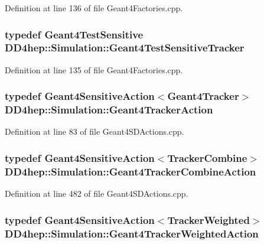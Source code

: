 Definition at line 136 of file Geant4Factories.cpp.\hypertarget{namespace_d_d4hep_1_1_simulation_a6a20cbc2140f1f0da9332fe90fb80600}{
\subsubsection[{Geant4TestSensitiveTracker}]{\setlength{\rightskip}{0pt plus 5cm}typedef {\bf Geant4TestSensitive} {\bf DD4hep::Simulation::Geant4TestSensitiveTracker}}}
\label{namespace_d_d4hep_1_1_simulation_a6a20cbc2140f1f0da9332fe90fb80600}


Definition at line 135 of file Geant4Factories.cpp.\hypertarget{namespace_d_d4hep_1_1_simulation_abb17b973f2ae551abf2c7662d5c05e12}{
\subsubsection[{Geant4TrackerAction}]{\setlength{\rightskip}{0pt plus 5cm}typedef {\bf Geant4SensitiveAction}$<${\bf Geant4Tracker}$>$ {\bf DD4hep::Simulation::Geant4TrackerAction}}}
\label{namespace_d_d4hep_1_1_simulation_abb17b973f2ae551abf2c7662d5c05e12}


Definition at line 83 of file Geant4SDActions.cpp.\hypertarget{namespace_d_d4hep_1_1_simulation_ae4372869044729bc07b6343c4e077fdc}{
\subsubsection[{Geant4TrackerCombineAction}]{\setlength{\rightskip}{0pt plus 5cm}typedef {\bf Geant4SensitiveAction}$<${\bf TrackerCombine}$>$ {\bf DD4hep::Simulation::Geant4TrackerCombineAction}}}
\label{namespace_d_d4hep_1_1_simulation_ae4372869044729bc07b6343c4e077fdc}


Definition at line 482 of file Geant4SDActions.cpp.\hypertarget{namespace_d_d4hep_1_1_simulation_a63833833f53787d1116da0c3bb635dc8}{
\subsubsection[{Geant4TrackerWeightedAction}]{\setlength{\rightskip}{0pt plus 5cm}typedef {\bf Geant4SensitiveAction}$<${\bf TrackerWeighted}$>$ {\bf DD4hep::Simulation::Geant4TrackerWeightedAction}}}
\label{namespace_d_d4hep_1_1_simulation_a63833833f53787d1116da0c3bb635dc8}


